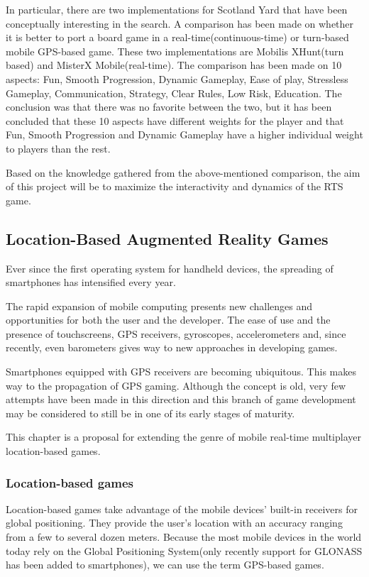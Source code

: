 \documentclass{article}
\begin{document}
In particular, there are two implementations for Scotland Yard that have been
conceptually interesting in the search. A comparison has been
made\cite{rttvsrts2} on whether it is better to port a board game in a
real-time(continuous-time) or turn-based mobile GPS-based game. These two
implementations are Mobilis XHunt(turn based) and MisterX Mobile(real-time). The
comparison has been made on 10 aspects: Fun, Smooth Progression, Dynamic
Gameplay, Ease of play, Stressless Gameplay, Communication, Strategy, Clear
Rules, Low Risk, Education. The conclusion was that there was no favorite
between the two, but it has been concluded that these 10 aspects have different
weights for the player and that Fun, Smooth Progression and Dynamic Gameplay
have a higher individual weight to players than the rest.\cite[p.5]{rttvsrts2}
\newline

Based on the knowledge gathered from the above-mentioned comparison, the aim of
this project will be to maximize the interactivity and dynamics of the RTS game.


\subsection{Location-Based Augmented Reality Games}

Ever since the first operating system for handheld devices, the spreading of
smartphones has intensified every year.\newline

The rapid expansion of mobile computing presents new challenges and
opportunities for both the user and the developer. The ease of use and the
presence of touchscreens, GPS receivers, gyroscopes, accelerometers and, since
recently, even barometers gives way to new approaches in developing
games.\newline

Smartphones equipped with GPS receivers are becoming ubiquitous. This makes way
to the propagation of GPS gaming. Although the concept is old, very few attempts
have been made in this direction and this branch of game development may be
considered to still be in one of its early stages of maturity.\newline

This chapter is a proposal for extending the genre of mobile real-time
multiplayer location-based games.

\subsubsection{Location-based games}
Location-based games take advantage of the mobile devices' built-in receivers
for global positioning. They provide the user's location with an accuracy
ranging from a few to several dozen meters. Because the most mobile devices in
the world today rely on the Global Positioning System(only recently support for
GLONASS has been added to smartphones), we can use the term GPS-based
games.\newline
\end{document}
